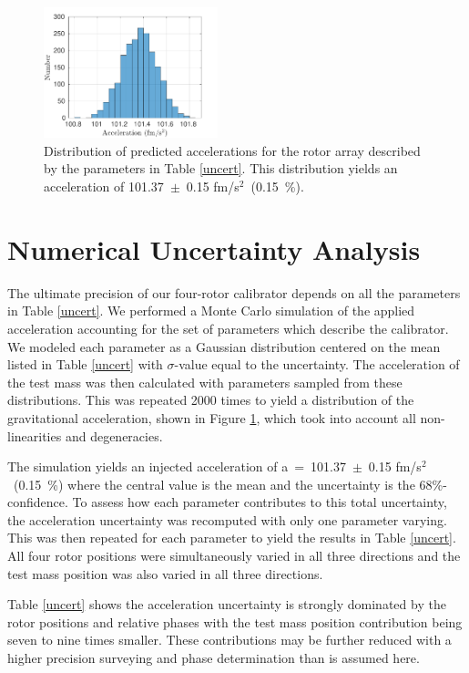 \documentclass[superscriptaddress, twocolumn, prd]{revtex4-1}
\begin{document}
\begin{figure}[!h]
\centering \includegraphics[width=0.45\textwidth]{Super4_Dist.pdf}
\caption{Distribution of predicted accelerations for the rotor array described by the parameters in Table \ref{uncert}. This distribution yields an acceleration of 101.37~$\pm$~0.15 fm/s$^2$~(0.15~\%).}
\label{dist} 
\end{figure}
\section{Numerical Uncertainty Analysis}

The ultimate precision of our four-rotor calibrator depends on all the parameters in Table \ref{uncert}. We performed a Monte Carlo simulation of the applied acceleration accounting for the set of parameters which describe the calibrator. We modeled each parameter as a Gaussian distribution centered on the mean listed in Table \ref{uncert} with $\sigma$-value equal to the uncertainty. The acceleration of the test mass was then calculated with parameters sampled from these distributions. This was repeated 2000 times to yield a distribution of the gravitational acceleration, shown in Figure \ref{dist}, which took into account all non-linearities and degeneracies. 


The simulation yields an injected acceleration of a~=~101.37~$\pm$~0.15 fm/s$^2$~(0.15~\%) where the central value is the mean and the uncertainty is the 68\%-confidence. To assess how each parameter contributes to this total uncertainty, the acceleration uncertainty was recomputed with only one parameter varying. This was then repeated for each parameter to yield the results in Table \ref{uncert}. All four rotor positions were simultaneously varied  in all three directions and the test mass position was also varied in all three directions.

Table \ref{uncert} shows the acceleration uncertainty is strongly dominated by the rotor positions and relative phases with the test mass position contribution being seven to nine times smaller. These contributions may be further reduced with a higher precision surveying and phase determination than is assumed here.
\\
\end{document}
